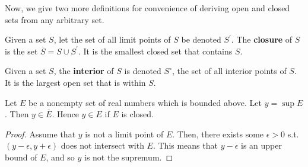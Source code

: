   Now, we give two more definitions for convenience of deriving open and closed sets from any arbitrary set. 

  \begin{definition}[Closure]
    Given a set $S$, let the set of all limit points of $S$ be denoted $S^\prime$. The \textbf{closure} of $S$ is the set $\overline{S} = S \cup S^\prime$. It is the smallest closed set that contains $S$. 
  \end{definition}

  \begin{definition}[Interior]
    Given a set $S$, the \textbf{interior} of $S$ is denoted $S^\circ$, the set of all interior points of $S$. It is the largest open set that is within $S$. 
  \end{definition}

  \begin{theorem}
    Let $E$ be a nonempty set of real numbers which is bounded above. Let $y = \sup{E}$. Then $y \in \overline{E}$. Hence $y \in E$ if $E$ is closed. 
  \end{theorem}
  \begin{proof}
    Assume that $y$ is not a limit point of $E$. Then, there exists some $\epsilon > 0$ s.t. $(y - \epsilon, y + \epsilon)$ does not intersect with $E$. This means that $y - \epsilon$ is an upper bound of $E$, and so $y$ is not the supremum. 
  \end{proof}

